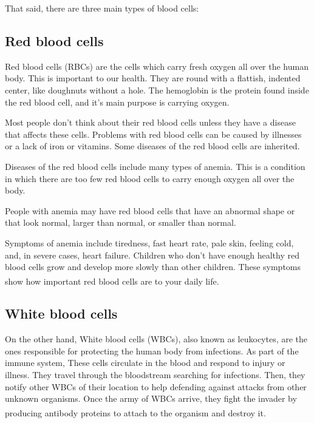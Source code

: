 That said, there are three main types of blood cells:

\subsection{Red blood cells}

Red blood cells (RBCs) are the cells which carry fresh oxygen all over the human body. This is important to our health. They are round with a flattish, indented center, like doughnuts without a hole. 
The hemoglobin is the protein found inside the red blood cell, and it's main purpose is carrying oxygen.

Most people don't think about their red blood cells unless they have a disease that affects these cells. Problems with red blood cells can be caused by illnesses or a lack of iron or vitamins. Some diseases of the red blood cells are inherited.

Diseases of the red blood cells include many types of anemia. This is a condition in which there are too few red blood cells to carry enough oxygen all over the body.

People with anemia may have red blood cells that have an abnormal shape or that look normal, larger than normal, or smaller than normal.

Symptoms of anemia include tiredness, fast heart rate, pale skin, feeling cold, and, in severe cases, heart failure. Children who don't have enough healthy red blood cells grow and develop more slowly than other children. These symptoms show how important red blood cells are to your daily life. \textsuperscript{\cite{Department_2022_rochester}}

\subsection{White blood cells}

On the other hand, White blood cells (WBCs), also known as leukocytes, are the ones responsible for protecting the human body from infections. As part of the immune system, These cells circulate in the blood and respond to injury or illness. They travel through the bloodstream searching for infections. Then, they notify other WBCs of their location to help defending against attacks from other unknown organisms. Once the army of WBCs arrive, they fight the invader by producing antibody proteins to attach to the organism and destroy it. \textsuperscript{\cite{Attacking_Any_Unknown_2022_clevelandclinic}}

